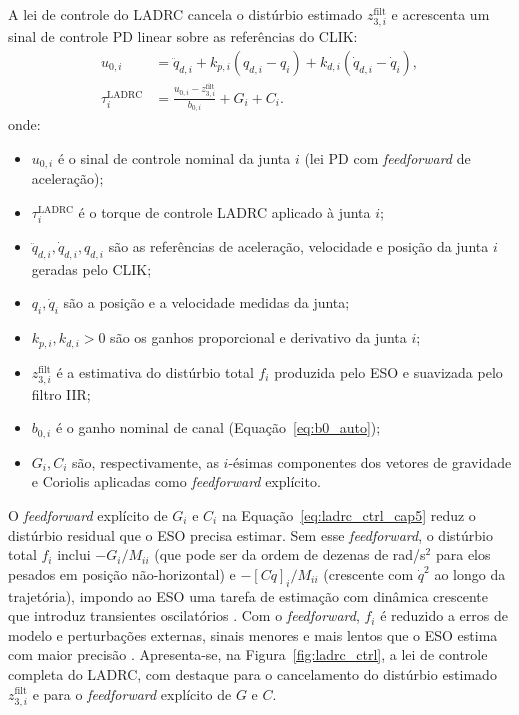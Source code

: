 A lei de controle do LADRC cancela o distúrbio estimado $z_{3,i}^{\text{filt}}$ e acrescenta um sinal de controle PD linear sobre as referências do CLIK:
\begin{align}
    u_{0,i} &= \ddot{q}_{d,i} + k_{p,i}(q_{d,i} - q_i) + k_{d,i}(\dot{q}_{d,i} - \dot{q}_i), \label{eq:adrc_u0_cap5}\\
    \tau_i^{\text{LADRC}} &= \frac{u_{0,i} - z_{3,i}^{\text{filt}}}{b_{0,i}} + G_i + C_i.
    \label{eq:ladrc_ctrl_cap5}
\end{align}
onde:
\begin{itemize}
    \item $u_{0,i}$ é o sinal de controle nominal da junta $i$ (lei PD com \textit{feedforward} de aceleração);
    \item $\tau_i^{\text{LADRC}}$ é o torque de controle LADRC aplicado à junta $i$;
    \item $\ddot{q}_{d,i}, \dot{q}_{d,i}, q_{d,i}$ são as referências de aceleração, velocidade e posição da junta $i$ geradas pelo CLIK;
    \item $q_i, \dot{q}_i$ são a posição e a velocidade medidas da junta;
    \item $k_{p,i}, k_{d,i} > 0$ são os ganhos proporcional e derivativo da junta $i$;
    \item $z_{3,i}^{\text{filt}}$ é a estimativa do distúrbio total $f_i$ produzida pelo ESO e suavizada pelo filtro IIR;
    \item $b_{0,i}$ é o ganho nominal de canal (Equação~\eqref{eq:b0_auto});
    \item $G_i, C_i$ são, respectivamente, as $i$-ésimas componentes dos vetores de gravidade e Coriolis aplicadas como \textit{feedforward} explícito.
\end{itemize}

O \textit{feedforward} explícito de $G_i$ e $C_i$ na Equação~\eqref{eq:ladrc_ctrl_cap5} reduz o distúrbio residual que o ESO precisa estimar. Sem esse \textit{feedforward}, o distúrbio total $f_i$ inclui $-G_i/M_{ii}$ (que pode ser da ordem de dezenas de rad/s$^2$ para elos pesados em posição não-horizontal) e $-[C\dot{q}]_i/M_{ii}$ (crescente com $\dot{q}^2$ ao longo da trajetória), impondo ao ESO uma tarefa de estimação com dinâmica crescente que introduz transientes oscilatórios \cite{han2009pid}. Com o \textit{feedforward}, $f_i$ é reduzido a erros de modelo e perturbações externas, sinais menores e mais lentos que o ESO estima com maior precisão \cite{huang2014active}. Apresenta-se, na Figura~\ref{fig:ladrc_ctrl}, a lei de controle completa do LADRC, com destaque para o cancelamento do distúrbio estimado $z_{3,i}^{\text{filt}}$ e para o \textit{feedforward} explícito de $G$ e $C$.

